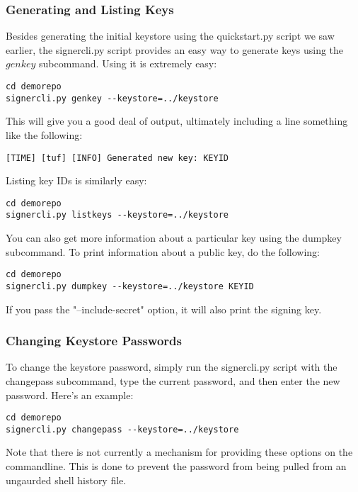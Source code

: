 \documentclass{article}
\begin{document}
\subsubsection{Generating and Listing Keys}
Besides generating the initial keystore using the quickstart.py script we saw
earlier, the signercli.py script provides an easy way to generate keys using the
$genkey$ subcommand. Using it is extremely easy:

\begin{lstlisting}
cd demorepo
signercli.py genkey --keystore=../keystore
\end{lstlisting}

This will give you a good deal of output, ultimately including a line something
like the following:

\begin{lstlisting}
[TIME] [tuf] [INFO] Generated new key: KEYID
\end{lstlisting}

Listing key IDs is similarly easy:

\begin{lstlisting}
cd demorepo
signercli.py listkeys --keystore=../keystore
\end{lstlisting}

You can also get more information about a particular key using the dumpkey
subcommand. To print information about a public key, do the following:

\begin{lstlisting}
cd demorepo
signercli.py dumpkey --keystore=../keystore KEYID
\end{lstlisting}

If you pass the "--include-secret" option, it will also print the signing key.

\subsubsection{Changing Keystore Passwords}

To change the keystore password, simply run the signercli.py script with the 
changepass subcommand, type the current password, and then enter the new password.
Here's an example:

\begin{lstlisting}
cd demorepo
signercli.py changepass --keystore=../keystore
\end{lstlisting}

Note that there is not currently a mechanism for providing these options on the
commandline. This is done to prevent the password from being pulled from an
ungaurded shell history file.
\end{document}
